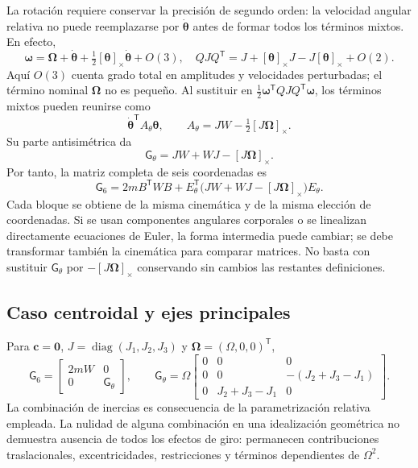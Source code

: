 \documentclass[11pt,a4paper,oneside]{report}
\newcommand{\vct}[1]{\bm{#1}}
\newcommand{\tr}{\mathsf T}
\newcommand{\diag}{\operatorname{diag}}
\begin{document}
La rotación requiere conservar la precisión de segundo orden: la velocidad angular relativa no puede reemplazarse por $\dot{\vct\theta}$ antes de formar todos los términos mixtos. En efecto,
\begin{equation}
 \vct\omega=\vct\Omega+\dot{\vct\theta}
 +\tfrac12[\vct\theta]_\times\dot{\vct\theta}+O(3),
 \quad QJQ^{\tr}=J+[\vct\theta]_\times J-J[\vct\theta]_\times+O(2).
\end{equation}
Aquí $O(3)$ cuenta grado total en amplitudes y velocidades perturbadas; el término nominal $\vct\Omega$ no es pequeño. Al sustituir en $\tfrac12\vct\omega^{\tr}QJQ^{\tr}\vct\omega$, los términos mixtos pueden reunirse como
\begin{equation}
 \dot{\vct\theta}^{\tr}A_\theta\vct\theta,
 \qquad A_\theta=JW-\tfrac12[J\vct\Omega]_\times.
\end{equation}
Su parte antisimétrica da
\begin{equation}
 \mathsf G_\theta=JW+WJ-[J\vct\Omega]_\times.
\end{equation}
Por tanto, la matriz completa de seis coordenadas es
\begin{equation}
 \boxed{\mathsf G_6=2mB^{\tr}WB+
 E_\theta^{\tr}\bigl(JW+WJ-[J\vct\Omega]_\times\bigr)E_\theta.}
 \label{eq:G6}
\end{equation}
Cada bloque se obtiene de la misma cinemática y de la misma elección de coordenadas. Si se usan componentes angulares corporales o se linealizan directamente ecuaciones de Euler, la forma intermedia puede cambiar; se debe transformar también la cinemática para comparar matrices. No basta con sustituir $\mathsf G_\theta$ por $-[J\vct\Omega]_\times$ conservando sin cambios las restantes definiciones.

\subsection{Caso centroidal y ejes principales}
Para $\vct c=\vct0$, $J=\diag(J_1,J_2,J_3)$ y $\vct\Omega=(\Omega,0,0)^{\tr}$,
\begin{equation}
 \mathsf G_6=\begin{bmatrix}2mW&0\\0&\mathsf G_\theta\end{bmatrix},
 \qquad
 \mathsf G_\theta=\Omega
 \begin{bmatrix}0&0&0\\0&0&-(J_2+J_3-J_1)\\0&J_2+J_3-J_1&0\end{bmatrix}.
\end{equation}
La combinación de inercias es consecuencia de la parametrización relativa empleada. La nulidad de alguna combinación en una idealización geométrica no demuestra ausencia de todos los efectos de giro: permanecen contribuciones traslacionales, excentricidades, restricciones y términos dependientes de $\Omega^2$.
\end{document}
